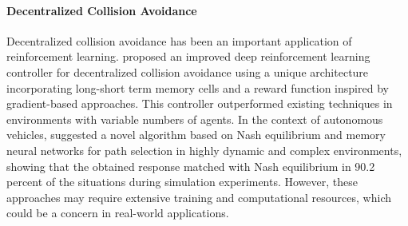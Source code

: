 \paragraph{Decentralized Collision Avoidance}
Decentralized collision avoidance has been an important application of reinforcement learning. \citet{thumiger2022a} proposed an improved deep reinforcement learning controller for decentralized collision avoidance using a unique architecture incorporating long-short term memory cells and a reward function inspired by gradient-based approaches. This controller outperformed existing techniques in environments with variable numbers of agents. In the context of autonomous vehicles, \citet{ardekani2022combining} suggested a novel algorithm based on Nash equilibrium and memory neural networks for path selection in highly dynamic and complex environments, showing that the obtained response matched with Nash equilibrium in 90.2 percent of the situations during simulation experiments. However, these approaches may require extensive training and computational resources, which could be a concern in real-world applications.
